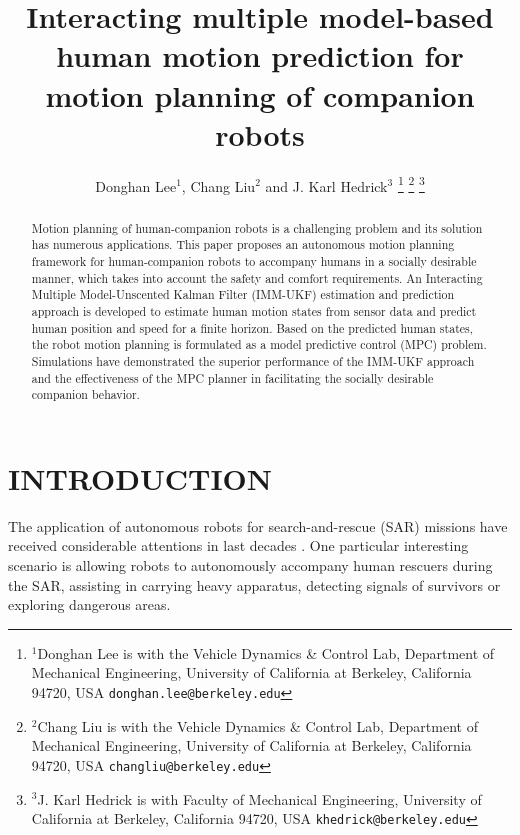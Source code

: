 \documentclass[letterpaper, 10 pt, conference]{ieeeconf}
\title{\LARGE \bf
	Interacting multiple model-based human motion prediction for\\ motion planning of companion robots
}
\author{Donghan Lee$^{1}$, Chang Liu$^{2}$ and J. Karl Hedrick$^{3}$%
	\thanks{$^{1}$Donghan Lee is with the Vehicle Dynamics \& Control Lab, Department of Mechanical Engineering, University of California at Berkeley, California 94720, USA
		{\tt\small donghan.lee@berkeley.edu}}%
	\thanks{$^{2}$Chang Liu is with the Vehicle Dynamics \& Control Lab, Department of Mechanical Engineering, University of California at Berkeley, California 94720, USA
		{\tt\small changliu@berkeley.edu}}%
	\thanks{$^{3}$J. Karl Hedrick is with Faculty of Mechanical Engineering, University of California at Berkeley, California 94720, USA
		{\tt\small khedrick@berkeley.edu}}%
}
\begin{document}
	
	\maketitle
	\thispagestyle{empty}
	\pagestyle{empty}
	
	\setlength{\belowcaptionskip}{-1pt} %
	\begin{abstract}
		Motion planning of human-companion robots is a challenging problem and its solution has numerous applications.
		This paper proposes an autonomous motion planning framework for human-companion robots to accompany humans in a socially desirable manner, which takes into account the safety and comfort requirements.
		An Interacting Multiple Model-Unscented Kalman Filter (IMM-UKF) estimation and prediction approach is developed to estimate human motion states from sensor data and predict human position and speed for a finite horizon.
		Based on the predicted human states, the robot motion planning is formulated as a model predictive control (MPC) problem.
		Simulations have demonstrated the superior performance of the IMM-UKF approach and the effectiveness of the MPC planner in facilitating the socially desirable companion behavior.
	\end{abstract}
	
	
	\section{INTRODUCTION} \label{sec:intro}
	The application of autonomous robots for search-and-rescue (SAR) missions have received considerable attentions in last decades \cite{casper2003human,nourbakhsh2005human,kruijff2012designing}.
	One particular interesting scenario is allowing robots to autonomously accompany human rescuers during the SAR, assisting in carrying heavy apparatus, detecting signals of survivors or exploring dangerous areas.
	
\end{document}
